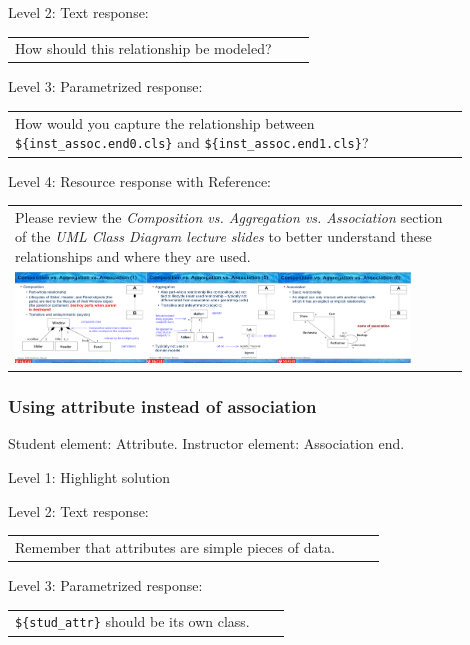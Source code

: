 \noindent Level 2: Text response: \medskip

\begin{tabular}{|p{0.9\linewidth}}
How should this relationship be modeled?
\end{tabular} \medskip

\noindent Level 3: Parametrized response: \medskip

\begin{tabular}{|p{0.9\linewidth}}
How would you capture the relationship between \verb|${inst_assoc.end0.cls}| and \verb|${inst_assoc.end1.cls}|?
\end{tabular} \medskip

\noindent Level 4: Resource response with Reference: \medskip

\begin{tabular}{|p{0.9\linewidth}}
Please review the \textit{Composition vs. Aggregation vs. Association} section of 
the \textit{UML Class Diagram lecture slides} to 
better understand these relationships and where they are used.

\\
\includegraphics[width=0.9\textwidth]{images/composition_aggregation_association.png}
\end{tabular} \medskip


\subsubsection{Using attribute instead of association}

Student element: Attribute. Instructor element: Association end. \medskip

\noindent Level 1: Highlight solution  \medskip

\noindent Level 2: Text response: \medskip

\begin{tabular}{|p{0.9\linewidth}}
Remember that attributes are simple pieces of data.
\end{tabular} \medskip

\noindent Level 3: Parametrized response: \medskip

\begin{tabular}{|p{0.9\linewidth}}
\verb|${stud_attr}| should be its own class.
\end{tabular} \medskip


